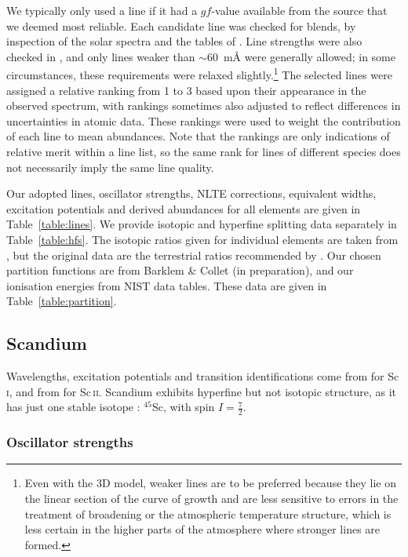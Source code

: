\documentclass[traditabstract]{aa}
\begin{document}
We typically only used a line if it had a $gf$-value available from
the source that we deemed most reliable. Each candidate line was
checked for blends, by inspection of the solar spectra
\citep{Brault87, LiegeAtlas} and the tables of
\citet{Moore66}. Line strengths were also checked in
\citet{Moore66}, and only lines weaker than \mbox{$\sim$60 m\AA}
were generally allowed; in some circumstances, these
requirements were relaxed slightly.\footnote{Even with the 3D model, weaker lines are to be preferred because they lie on the linear section of the curve of growth and are less sensitive to errors in the treatment of broadening or the atmospheric temperature structure, which is less certain in the higher parts of the atmosphere where stronger lines are formed.} The selected lines were assigned
a relative ranking from 1 to 3 based upon their appearance in the
observed spectrum, with rankings sometimes also adjusted to reflect
differences in uncertainties in atomic data.  These rankings were
used to weight the contribution of each line to mean abundances. 
Note that the rankings are only indications of relative merit
within a line list, so the same rank for lines of different species does not necessarily imply the same line quality.

Our adopted lines, oscillator strengths, NLTE corrections, equivalent widths, excitation potentials and derived abundances
for all elements are given in Table~\ref{table:lines}.  We provide isotopic and hyperfine splitting data separately in Table~\ref{table:hfs}.  The isotopic ratios given for individual elements are taken from , but the original data are the terrestrial ratios recommended by \citet{IUPAC98}.  Our chosen partition functions are from Barklem \& Collet (in preparation), and our ionisation energies from NIST data tables.  These data are given in Table~\ref{table:partition}.

\subsection{Scandium}
\label{Scatomicdata}

Wavelengths, excitation potentials and transition identifications come from \citet{Kaufman88} for Sc\,\textsc{i}, and
from \citet{Johansson80} for Sc\,\textsc{ii}.  Scandium exhibits hyperfine but not isotopic structure, as it has just
one stable isotope \citep{IUPAC98}: $^{45}$Sc, with spin $I=\frac{7}{2}$.

\subsubsection{Oscillator strengths}
\label{Scgfs}
\end{document}
